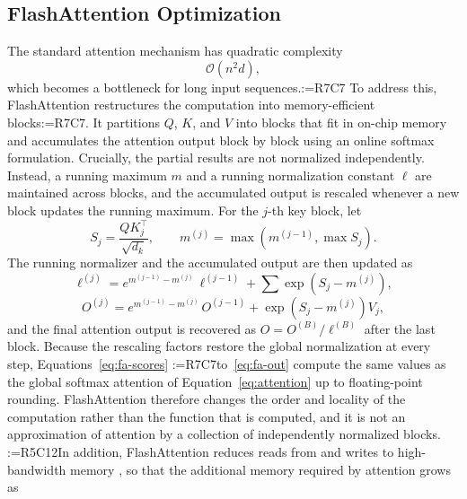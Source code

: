 \documentclass[a4paper,fleqn]{cas-sc}
\makeatletter
\newif\iftracked
\newcommand{\rv@setcolour}[1]{%
  \IfStrEq{#1}{R7C7}{\color{rvEdit}}{%
    \IfSubStr{#1}{R5}{\IfSubStr{#1}{R7}{\color{rvBoth}}{\color{rvFive}}}{\color{rvSeven}}}}
\newcommand{\rv@tag}[1]{\textsuperscript{\sffamily\bfseries\scriptsize[\StrSubstitute{#1}{,}{, }]}\,}
\newcommand{\rv@recordone}[1]{%
  \edef\rv@i{#1}%
  \ifcsdef{rv@n@\rv@i}{}{\csgdef{rv@n@\rv@i}{0}}%
  \csxdef{rv@n@\rv@i}{\the\numexpr\csuse{rv@n@\rv@i}+1\relax}%
  \begingroup\edef\@currentlabel{\rv@i}\label{rv:\rv@i:\csuse{rv@n@\rv@i}}\endgroup}
\newcommand{\rv@record}[1]{\@for\rv@id:=#1\do{\expandafter\rv@recordone\expandafter{\rv@id}}}
\DeclareRobustCommand{\rcdel}[2]{\rv@record{#1}\iftracked{\rv@setcolour{#1}\rv@tag{#1}\rv@strike{#2}}\else\unskip\fi}
\DeclareRobustCommand{\rcrep}[3]{\rv@record{#1}\iftracked{\rv@setcolour{#1}\rv@tag{#1}\rv@strike{#2} #3}\else#3\fi}
\DeclareRobustCommand{\rce}[1]{\rv@record{R7C7}\iftracked{\color{rvEdit}#1}\else#1\fi}
\makeatother
\begin{document}
\subsection{FlashAttention Optimization}
\label{sec:fa-method}
The standard attention mechanism has quadratic complexity
\begin{equation}
\mathcal{O}(n^{2}d),
\label{eq:complexity}
\end{equation}
which becomes a bottleneck for long input sequences.\rcdel{R7C7}{As defined earlier in Equation (13), this limits scalability.} To address this, FlashAttention \citep{dao2022flashattention,dao2024flashattention2} restructures the computation into memory-efficient blocks\rcrep{R7C7}{: FlashAttention partitions}{. It partitions} $Q$, $K$, and $V$ into blocks that fit in on-chip memory and accumulates the attention output block by block using an online softmax formulation. Crucially, the partial results are not normalized independently. Instead, a running maximum $m$ and a running normalization constant $\ell$ are maintained across blocks, and the accumulated output is rescaled whenever a new block updates the running maximum. For the $j$-th key block, let
\begin{equation}
S_j = \frac{QK_j^{\top}}{\sqrt{d_k}}, \qquad m^{(j)} = \max\!\left(m^{(j-1)}, \max S_j\right).
\label{eq:fa-scores}
\end{equation}
The running normalizer and the accumulated output are then updated as
\begin{equation}
\ell^{(j)} = e^{m^{(j-1)}-m^{(j)}}\,\ell^{(j-1)} + \sum \exp\!\left(S_j - m^{(j)}\right),
\label{eq:fa-norm}
\end{equation}
\begin{equation}
O^{(j)} = e^{m^{(j-1)}-m^{(j)}}\,O^{(j-1)} + \exp\!\left(S_j - m^{(j)}\right)V_j,
\label{eq:fa-out}
\end{equation}
and the final attention output is recovered as $O = O^{(B)}/\ell^{(B)}$ after the last block. Because the rescaling factors restore the global normalization at every step, Equations~\eqref{eq:fa-scores} \rce{to}~\eqref{eq:fa-out} compute the same values as the global softmax attention of Equation~\eqref{eq:attention} up to floating-point rounding. FlashAttention therefore changes the order and locality of the computation rather than the function that is computed, and it is not an approximation of attention by a collection of independently normalized blocks. \rcrep{R5C12}{Additionally, FlashAttention optimizes Wang et al. (2020) memory access by minimizing reads and writes, so that the memory cost becomes}{In addition, FlashAttention reduces reads from and writes to high-bandwidth memory \citep{dao2022flashattention}, so that the additional memory required by attention grows as}
\end{document}
